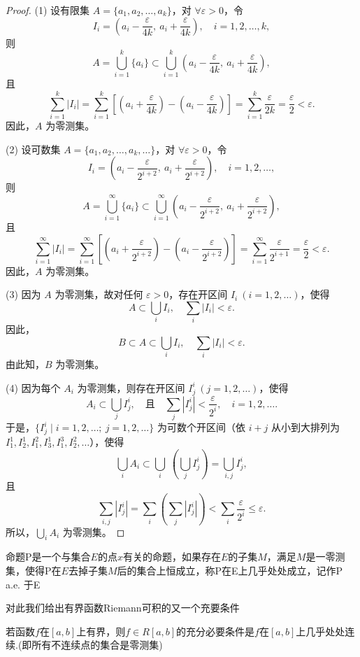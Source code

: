 \documentclass[lang=cn,12pt]{elegantbook}
\begin{document}
\begin{proof}
    (1) 设有限集 \( A = \{a_1, a_2, \dots, a_k\} \)，对 \( \forall \varepsilon > 0 \)，令
\[
I_i = \left(a_i - \frac{\varepsilon}{4k},\ a_i + \frac{\varepsilon}{4k}\right),\quad i = 1, 2, \dots, k,
\]
则
\[
A = \bigcup_{i=1}^k \{a_i\} \subset \bigcup_{i=1}^k \left(a_i - \frac{\varepsilon}{4k},\ a_i + \frac{\varepsilon}{4k}\right),
\]
且
\[
\sum_{i=1}^k |I_i| = \sum_{i=1}^k \left[\left(a_i + \frac{\varepsilon}{4k}\right) - \left(a_i - \frac{\varepsilon}{4k}\right)\right]
= \sum_{i=1}^k \frac{\varepsilon}{2k} = \frac{\varepsilon}{2} < \varepsilon.
\]
因此，\( A \) 为零测集。

(2) 设可数集 \( A = \{a_1, a_2, \dots, a_k, \dots\} \)，对 \( \forall \varepsilon > 0 \)，令
\[
I_i = \left(a_i - \frac{\varepsilon}{2^{i+2}},\ a_i + \frac{\varepsilon}{2^{i+2}}\right),\quad i = 1, 2, \dots,
\]
则
\[
A = \bigcup_{i=1}^\infty \{a_i\} \subset \bigcup_{i=1}^\infty \left(a_i - \frac{\varepsilon}{2^{i+2}},\ a_i + \frac{\varepsilon}{2^{i+2}}\right),
\]
且
\[
\sum_{i=1}^\infty |I_i| = \sum_{i=1}^\infty \left[\left(a_i + \frac{\varepsilon}{2^{i+2}}\right) - \left(a_i - \frac{\varepsilon}{2^{i+2}}\right)\right]
= \sum_{i=1}^\infty \frac{\varepsilon}{2^{i+1}} = \frac{\varepsilon}{2} < \varepsilon.
\]
因此，\( A \) 为零测集。

(3) 因为 \( A \) 为零测集，故对任何 \( \varepsilon > 0 \)，存在开区间 \( I_i\ (i = 1, 2, \dots) \)，使得
\[
A \subset \bigcup_i I_i,\quad \sum_i |I_i| < \varepsilon.
\]
因此，
\[
B \subset A \subset \bigcup_i I_i,\quad \sum_i |I_i| < \varepsilon.
\]
由此知，\( B \) 为零测集。

(4) 因为每个 \( A_i \) 为零测集，则存在开区间 \( I_{j}^i\ (j = 1, 2, \dots) \)，使得
\[
A_i \subset \bigcup_{j} I_{j}^i,\quad \text{且}\quad \sum_{j} |I_{j}^i| < \frac{\varepsilon}{2^i},\quad i = 1, 2, \dots.
\]
于是，\(\{I_{j}^i \mid i = 1, 2, \dots;\ j = 1, 2, \dots\}\) 为可数个开区间（依 \( i+j \) 从小到大排列为 \( I_{1}^1, I_{2}^1, I_{1}^2, I_{3}^1,I_{1}^3,I_{2}^2 ,\dots \)），使得
\[
\bigcup_i A_i \subset \bigcup_i \;(\bigcup_j I_{j}^i) =   \bigcup_{i,j} I_{j}^i,
\]
且
\[
\sum_{i,j} |I_{j}^i| = \sum_{i} \left( \sum_{j}|I_{j}^i| \right) < \sum_{i} \frac{\varepsilon}{2^i} \leq \varepsilon.
\]
所以，\(\bigcup_i A_i\) 为零测集。
\end{proof}

\begin{definition}[几乎处处]
    命题P是一个与集合$E$的点$x$有关的命题，如果存在$E$的子集$M$，满足$M$是一零测集，使得P在$E$去掉子集$M$后的集合上恒成立，称P在E上几乎处处成立，记作P a.e. 于E
\end{definition}
对此我们给出有界函数Riemann可积的又一个充要条件
\begin{theorem}[Lebesgue定理]
    若函数$f$在$[a,b]$上有界，则$f \in R[a,b]$的充分必要条件是$f$在$[a,b]$上几乎处处连续.(即所有不连续点的集合是零测集)
\end{theorem}
\end{document}

